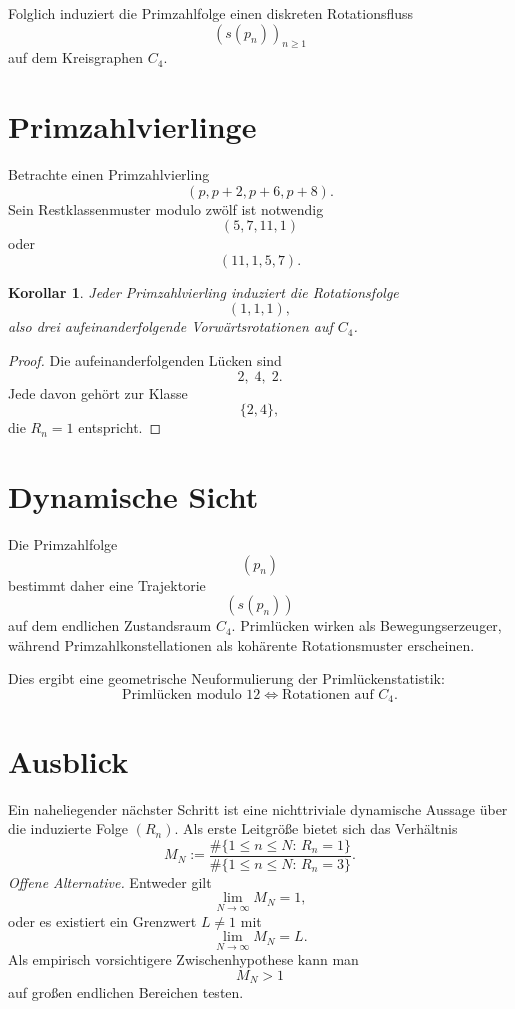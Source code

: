 \documentclass[11pt]{article}
\newtheorem{corollary}{Korollar}
\theoremstyle{definition}
\begin{document}
Folglich induziert die Primzahlfolge einen diskreten Rotationsfluss
\[
(s(p_n))_{n\ge 1}
\]
auf dem Kreisgraphen $C_4$.

\section{Primzahlvierlinge}

Betrachte einen Primzahlvierling
\[
(p,p+2,p+6,p+8).
\]
Sein Restklassenmuster modulo zw\"olf ist notwendig
\[
(5,7,11,1)
\]
oder
\[
(11,1,5,7).
\]

\begin{corollary}
Jeder Primzahlvierling induziert die Rotationsfolge
\[
(1,1,1),
\]
also drei aufeinanderfolgende Vorw\"artsrotationen auf $C_4$.
\end{corollary}

\begin{proof}
Die aufeinanderfolgenden L\"ucken sind
\[
2,\;4,\;2.
\]
Jede davon geh\"ort zur Klasse
\[
\{2,4\},
\]
die $R_n=1$ entspricht.
\end{proof}

\section{Dynamische Sicht}

Die Primzahlfolge
\[
(p_n)
\]
bestimmt daher eine Trajektorie
\[
(s(p_n))
\]
auf dem endlichen Zustandsraum $C_4$.
Priml\"ucken wirken als Bewegungserzeuger, w\"ahrend Primzahlkonstellationen als koh\"arente Rotationsmuster erscheinen.

Dies ergibt eine geometrische Neuformulierung der Priml\"uckenstatistik:
\[
\boxed{
\text{Priml\"ucken modulo }12
\Longleftrightarrow
\text{Rotationen auf }C_4.
}
\]

\section{Ausblick}

Ein naheliegender n\"achster Schritt ist eine nichttriviale dynamische Aussage \"uber die induzierte Folge $(R_n)$. Als erste Leitgr\"o{\ss}e bietet sich das Verh\"altnis
\[
M_N
:=
\frac{\#\{1\le n\le N:\,R_n=1\}}
{\#\{1\le n\le N:\,R_n=3\}}.
\]
\emph{Offene Alternative.} Entweder gilt
\[
\lim_{N\to\infty} M_N = 1,
\]
oder es existiert ein Grenzwert $L\neq1$ mit
\[
\lim_{N\to\infty} M_N = L.
\]
Als empirisch vorsichtigere Zwischenhypothese kann man
\[
M_N>1
\]
auf gro{\ss}en endlichen Bereichen testen.
\end{document}
